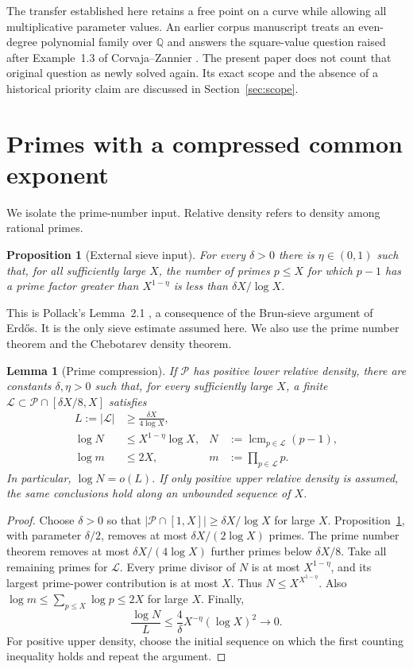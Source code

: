 \documentclass[11pt,a4paper]{article}
\newtheorem{lemma}[theorem]{Lemma}
\newtheorem{proposition}[theorem]{Proposition}
\theoremstyle{definition}
\theoremstyle{remark}
\newcommand{\Q}{\mathbb Q}
\newcommand{\cP}{\mathcal P}
\newcommand{\cL}{\mathcal L}
\DeclareMathOperator{\lcm}{lcm}
\begin{document}
The transfer established here retains a free point on a curve while
allowing all multiplicative parameter values. An earlier corpus manuscript
\cite{Corpus60} treats an even-degree polynomial family over $\Q$ and
answers the square-value question raised after Example~1.3 of
Corvaja--Zannier \cite{CZ}. The present paper does not count that original
question as newly solved again. Its exact scope and the absence of a
historical priority claim are discussed in Section~\ref{sec:scope}.

\section{Primes with a compressed common exponent}

We isolate the prime-number input. Relative density refers to density
among rational primes.

\begin{proposition}[External sieve input]\label{prop:Pollack}
For every $\delta>0$ there is $\eta\in(0,1)$ such that, for all sufficiently
large $X$, the number of primes $p\le X$ for which $p-1$ has a prime
factor greater than $X^{1-\eta}$ is less than $\delta X/\log X$.
\end{proposition}
This is Pollack's Lemma~2.1 \cite{Pollack}, a consequence of the Brun-sieve
argument of Erd\H{o}s. It is the only sieve estimate assumed here. We also
use the prime number theorem and the Chebotarev density theorem.

\begin{lemma}[Prime compression]\label{lem:compression}
If $\cP$ has positive lower relative density, there are constants
$\delta,\eta>0$ such that, for every sufficiently large $X$, a finite
$\cL\subset\cP\cap[\delta X/8,X]$ satisfies
\begin{align}
 L:=|\cL|&\ge\frac{\delta X}{4\log X},\label{eq:Lbound}\\
 \log N&\le X^{1-\eta}\log X,
 &N&:=\lcm_{p\in\cL}(p-1),\label{eq:Nbound}\\
 \log m&\le2X,
 &m&:=\prod_{p\in\cL}p.\label{eq:mbound}
\end{align}
In particular, $\log N=o(L)$. If only positive upper relative density is
assumed, the same conclusions hold along an unbounded sequence of $X$.
\end{lemma}
\begin{proof}
Choose $\delta>0$ so that $|\cP\cap[1,X]|\ge\delta X/\log X$ for large
$X$. Proposition~\ref{prop:Pollack}, with parameter $\delta/2$, removes
at most $\delta X/(2\log X)$ primes. The prime number theorem removes at
most $\delta X/(4\log X)$ further primes below $\delta X/8$.
Take all remaining primes for $\cL$.
Every prime divisor of $N$ is at most $X^{1-\eta}$, and its largest
prime-power contribution is at most $X$. Thus
$N\le X^{X^{1-\eta}}$. Also
$\log m\le\sum_{p\le X}\log p\le2X$ for large $X$.
Finally,
\[
 \frac{\log N}{L}\le\frac4\delta X^{-\eta}(\log X)^2\longrightarrow0.
\]
For positive upper density, choose the initial sequence on which the
first counting inequality holds and repeat the argument.
\end{proof}
\end{document}
